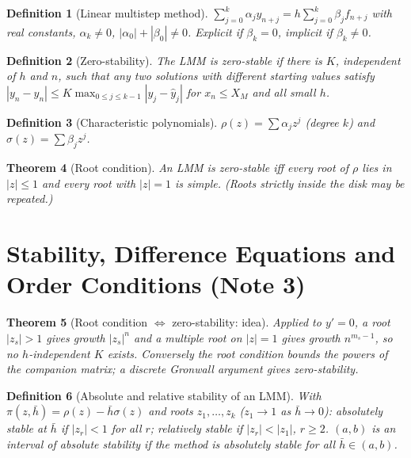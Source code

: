 \documentclass[10pt,a4paper]{article}
\theoremstyle{tight}
\newtheorem{theorem}{Theorem}[section]
\newtheorem{definition}[theorem]{Definition}
\newcommand{\hb}{\bar h}
\begin{document}
\begin{definition}[Linear multistep method]
\(\sum_{j=0}^k\alpha_jy_{n+j}=h\sum_{j=0}^k\beta_jf_{n+j}\) with real constants,
\(\alpha_k\ne0\), \(|\alpha_0|+|\beta_0|\ne0\). Explicit if \(\beta_k=0\), implicit if \(\beta_k\ne0\).
\end{definition}

\begin{definition}[Zero-stability]
The LMM is zero-stable if there is \(K\), independent of \(h\) and \(n\), such that any two
solutions with different starting values satisfy
\(|y_n-\hat y_n|\le K\max_{0\le j\le k-1}|y_j-\hat y_j|\) for \(x_n\le X_M\) and all small \(h\).
\end{definition}

\begin{definition}[Characteristic polynomials]
\(\rho(z)=\sum\alpha_jz^j\) (degree \(k\)) and \(\sigma(z)=\sum\beta_jz^j\).
\end{definition}

\begin{theorem}[Root condition]
An LMM is zero-stable iff every root of \(\rho\) lies in \(|z|\le1\) and every root with
\(|z|=1\) is simple. (Roots strictly inside the disk may be repeated.)
\end{theorem}

\section{Stability, Difference Equations and Order Conditions (Note 3)}

\begin{theorem}[Root condition \(\iff\) zero-stability: idea]
Applied to \(y'=0\), a root \(|z_s|>1\) gives growth \(|z_s|^n\) and a multiple root on
\(|z|=1\) gives growth \(n^{m_s-1}\), so no \(h\)-independent \(K\) exists. Conversely the root
condition bounds the powers of the companion matrix; a discrete Gronwall argument gives zero-stability.
\end{theorem}

\begin{definition}[Absolute and relative stability of an LMM]
With \(\pi(z,\hb)=\rho(z)-\hb\sigma(z)\) and roots \(z_1,\dots,z_k\) (\(z_1\to1\) as \(\hb\to0\)):
absolutely stable at \(\hb\) if \(|z_r|<1\) for all \(r\); relatively stable if \(|z_r|<|z_1|\), \(r\ge2\).
\((a,b)\) is an interval of absolute stability if the method is absolutely stable for all \(\hb\in(a,b)\).
\end{definition}
\end{document}
